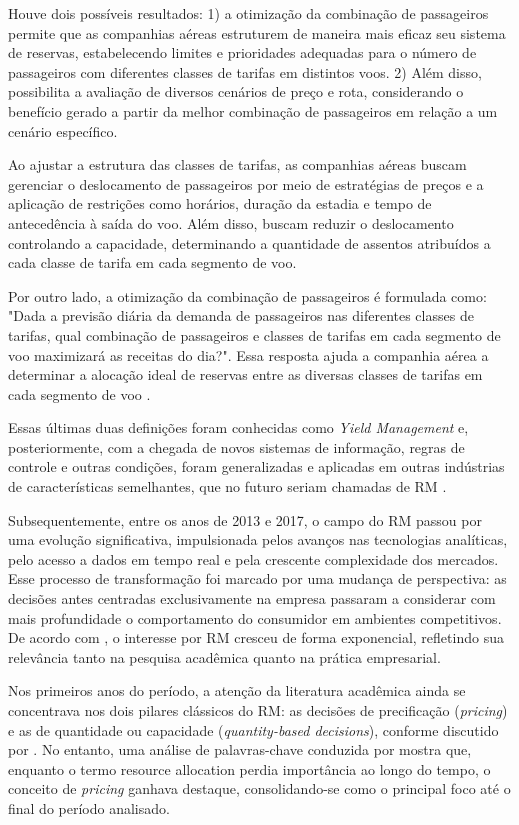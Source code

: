 Houve dois possíveis resultados: 1) a otimização da combinação de passageiros permite que as companhias aéreas estruturem de maneira mais eficaz seu sistema de reservas, estabelecendo limites e prioridades adequadas para o número de passageiros com diferentes classes de tarifas em distintos voos. 2) Além disso, possibilita a avaliação de diversos cenários de preço e rota, considerando o benefício gerado a partir da melhor combinação de passageiros em relação a um cenário específico.

Ao ajustar a estrutura das classes de tarifas, as companhias aéreas buscam gerenciar o deslocamento de passageiros por meio de estratégias de preços e a aplicação de restrições como horários, duração da estadia e tempo de antecedência à saída do voo. Além disso, buscam reduzir o deslocamento controlando a capacidade, determinando a quantidade de assentos atribuídos a cada classe de tarifa em cada segmento de voo.

Por outro lado, a otimização da combinação de passageiros é formulada como: "Dada a previsão diária da demanda de passageiros nas diferentes classes de tarifas, qual combinação de passageiros e classes de tarifas em cada segmento de voo maximizará as receitas do dia?". Essa resposta ajuda a companhia aérea a determinar a alocação ideal de reservas entre as diversas classes de tarifas em cada segmento de voo \citep{article_base}.

Essas últimas duas definições foram conhecidas como \textit{Yield Management} e, posteriormente, com a chegada de novos sistemas de informação, regras de controle e outras condições, foram generalizadas e aplicadas em outras indústrias de características semelhantes, que no futuro seriam chamadas de RM \citep{article_YM_to_RM}.


Subsequentemente, entre os anos de 2013 e 2017, o campo do RM passou por uma evolução significativa, impulsionada pelos avanços nas tecnologias analíticas, pelo acesso a dados em tempo real e pela crescente complexidade dos mercados. Esse processo de transformação foi marcado por uma mudança de perspectiva: as decisões antes centradas exclusivamente na empresa passaram a considerar com mais profundidade o comportamento do consumidor em ambientes competitivos. De acordo com \citet{Mulyani2021TheFH}, o interesse por RM cresceu de forma exponencial, refletindo sua relevância tanto na pesquisa acadêmica quanto na prática empresarial.

Nos primeiros anos do período, a atenção da literatura acadêmica ainda se concentrava nos dois pilares clássicos do RM: as decisões de precificação (\textit{pricing}) e as de quantidade ou capacidade (\textit{quantity-based decisions}), conforme discutido por \citet{talluri2004theory}. No entanto, uma análise de palavras-chave conduzida por \citet{Mulyani2021TheFH} mostra que, enquanto o termo resource allocation perdia importância ao longo do tempo, o conceito de \textit{pricing} ganhava destaque, consolidando-se como o principal foco até o final do período analisado.

